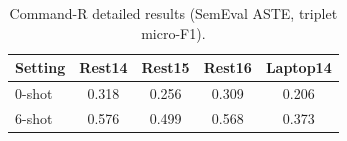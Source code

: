 \documentclass[12pt,a4paper]{report}
\begin{document}
\begin{table}[H]
\centering
\caption{Command-R detailed results (SemEval ASTE, triplet micro-F1).}
\small
\begin{tabular}{@{}lcccc@{}}
\toprule
\textbf{Setting} & \textbf{Rest14} & \textbf{Rest15} & \textbf{Rest16} & \textbf{Laptop14} \\
\midrule
0-shot & 0.318 & 0.256 & 0.309 & 0.206 \\
6-shot & 0.576 & 0.499 & 0.568 & 0.373 \\
\bottomrule
\end{tabular}
\end{table}


\clearpage
{}


\end{document}
